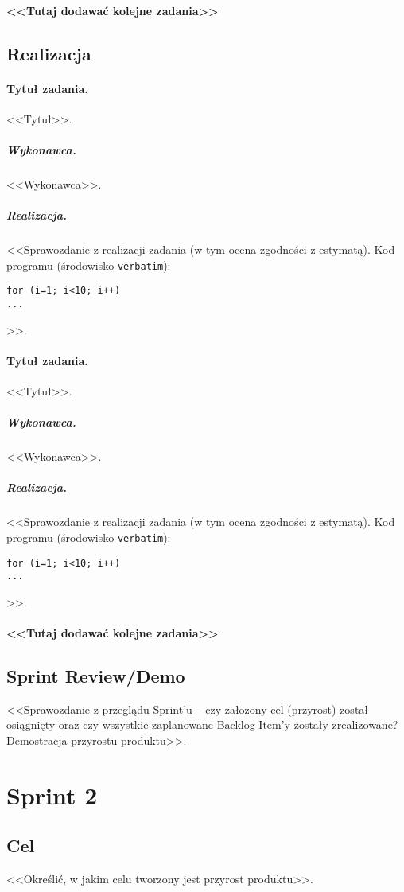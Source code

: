 \documentclass[a4paper]{article}
\begin{document}
\paragraph{<<Tutaj dodawać kolejne zadania>>}

\subsection{Realizacja} %

\paragraph{Tytuł zadania.} <<Tytuł>>.
\subparagraph{Wykonawca.} <<Wykonawca>>.
\subparagraph{Realizacja.} <<Sprawozdanie z realizacji zadania (w tym ocena zgodności z estymatą). Kod programu (środowisko \texttt{verbatim}): \begin{verbatim}
for (i=1; i<10; i++)
...
\end{verbatim}>>.

\paragraph{Tytuł zadania.} <<Tytuł>>.
\subparagraph{Wykonawca.} <<Wykonawca>>.
\subparagraph{Realizacja.} <<Sprawozdanie z realizacji zadania (w tym ocena zgodności z estymatą). Kod programu (środowisko \texttt{verbatim}): \begin{verbatim}
for (i=1; i<10; i++)
...
\end{verbatim}>>.

\paragraph{<<Tutaj dodawać kolejne zadania>>}


\subsection{Sprint Review/Demo}
<<Sprawozdanie z przeglądu Sprint'u -- czy założony cel (przyrost) został osiągnięty oraz czy wszystkie zaplanowane Backlog Item'y zostały zrealizowane? Demostracja przyrostu produktu>>.

\section{Sprint 2}

\subsection{Cel} <<Określić, w jakim celu tworzony jest przyrost produktu>>.
\end{document}
